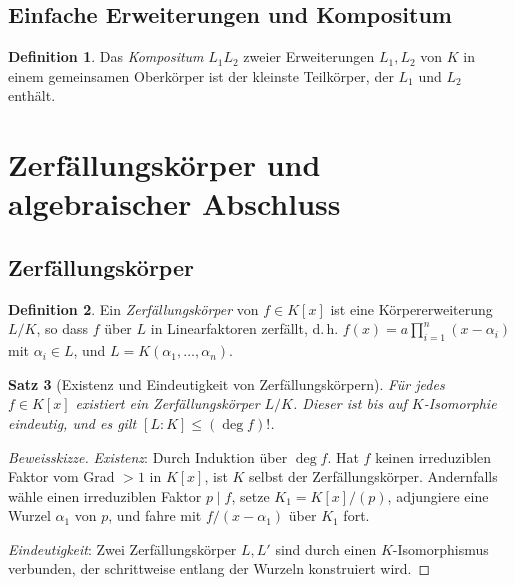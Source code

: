 \documentclass[12pt,a4paper]{amsart}
\newtheorem{theorem}{Satz}[section]
\theoremstyle{definition}
\newtheorem{definition}[theorem]{Definition}
\begin{document}
\subsection{Einfache Erweiterungen und Kompositum}

\begin{definition}
Das \emph{Kompositum} $L_1 L_2$ zweier Erweiterungen $L_1, L_2$ von $K$ in
einem gemeinsamen Oberkörper ist der kleinste Teilkörper, der $L_1$ und $L_2$
enthält.
\end{definition}

\section{Zerfällungskörper und algebraischer Abschluss}

\subsection{Zerfällungskörper}

\begin{definition}
Ein \emph{Zerfällungskörper} von $f \in K[x]$ ist eine Körpererweiterung
$L/K$, so dass $f$ über $L$ in Linearfaktoren zerfällt, d.\,h.
$f(x) = a \prod_{i=1}^n (x - \alpha_i)$ mit $\alpha_i \in L$, und
$L = K(\alpha_1,\dots,\alpha_n)$.
\end{definition}

\begin{theorem}[Existenz und Eindeutigkeit von Zerfällungskörpern]
\label{thm:zerfall}
Für jedes $f \in K[x]$ existiert ein Zerfällungskörper $L/K$. Dieser ist bis
auf $K$-Isomorphie eindeutig, und es gilt $[L:K] \leq (\deg f)!$.
\end{theorem}

\begin{proof}[Beweisskizze]
\emph{Existenz}: Durch Induktion über $\deg f$. Hat $f$ keinen irreduziblen
Faktor vom Grad $> 1$ in $K[x]$, ist $K$ selbst der Zerfällungskörper. Andernfalls
wähle einen irreduziblen Faktor $p \mid f$, setze $K_1 = K[x]/(p)$, adjungiere
eine Wurzel $\alpha_1$ von $p$, und fahre mit $f/(x-\alpha_1)$ über $K_1$ fort.

\emph{Eindeutigkeit}: Zwei Zerfällungskörper $L, L'$ sind durch einen
$K$-Isomorphismus verbunden, der schrittweise entlang der Wurzeln konstruiert wird.
\end{proof}
\end{document}
